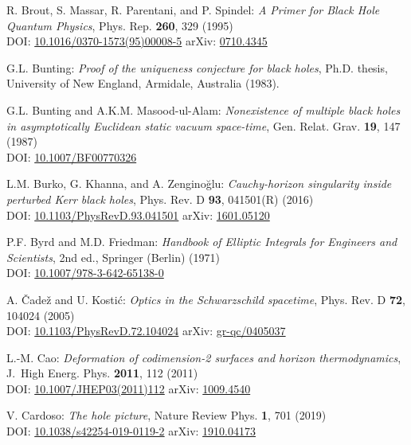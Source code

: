 \begin{thebibliography}{123}
R. Brout, S. Massar, R. Parentani, and P. Spindel:
{\em A Primer for Black Hole Quantum Physics},
Phys. Rep. {\bf 260}, 329 (1995)\\
DOI: \href{https://doi.org/10.1016/0370-1573(95)00008-5}{10.1016/0370-1573(95)00008-5}\hfill
arXiv: \href{https://arxiv.org/abs/0710.4345}{0710.4345}

G.L. Bunting:
{\em Proof of the uniqueness conjecture for black holes},
Ph.D. thesis, University of New England, Armidale, Australia (1983).

G.L. Bunting and A.K.M. Masood-ul-Alam:
{\em Nonexistence of multiple black holes in asymptotically Euclidean static vacuum space-time},
Gen. Relat. Grav. {\bf 19}, 147 (1987)\\
DOI: \href{https://doi.org/10.1007/BF00770326}{10.1007/BF00770326}

L.M. Burko, G. Khanna, and A. Zenginoğlu: {\em
Cauchy-horizon singularity inside perturbed Kerr black holes},
Phys. Rev. D {\bf 93}, 041501(R) (2016) \\
DOI: \href{https://doi.org/10.1103/PhysRevD.93.041501}{10.1103/PhysRevD.93.041501}\hfill
arXiv: \href{https://arxiv.org/abs/1601.05120}{1601.05120}

P.F. Byrd and M.D. Friedman:
{\em Handbook of Elliptic Integrals for Engineers and Scientists},
2nd ed., Springer (Berlin) (1971)\\
DOI: \href{https://doi.org/10.1007/978-3-642-65138-0}{10.1007/978-3-642-65138-0}

A. \v{C}ade\v{z} and U. Kosti\'c:
{\em Optics in the Schwarzschild spacetime},
Phys. Rev. D {\bf 72}, 104024 (2005)\\
DOI: \href{https://doi.org/10.1103/PhysRevD.72.104024}{10.1103/PhysRevD.72.104024}\hfill
arXiv: \href{https://arxiv.org/abs/gr-qc/0405037}{gr-qc/0405037}

L.-M. Cao:
{\em Deformation of codimension-2 surfaces and horizon thermodynamics},
J.~High Energ. Phys. {\bf 2011}, 112 (2011)\\
DOI: \href{https://doi.org/10.1007/JHEP03(2011)112}{10.1007/JHEP03(2011)112}\hfill
arXiv: \href{https://arxiv.org/abs/1009.4540}{1009.4540}

V. Cardoso:
{\em The hole picture},
Nature Review Phys. {\bf 1}, 701 (2019)\\
DOI: \href{https://doi.org/10.1038/s42254-019-0119-2}{10.1038/s42254-019-0119-2}\hfill
arXiv: \href{https://arxiv.org/abs/1910.04173}{1910.04173}


\end{thebibliography}
